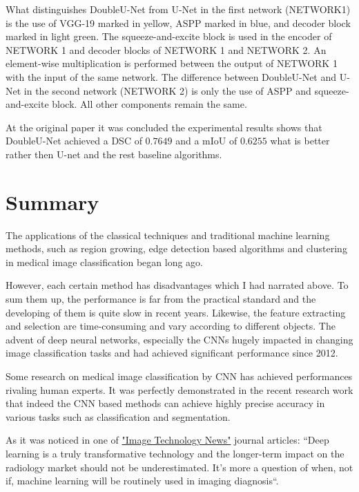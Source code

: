 What distinguishes DoubleU-Net from U-Net in the first network (NETWORK1) is the use of VGG-19 marked in yellow, ASPP marked in blue, and decoder block marked in light green. The squeeze-and-excite block is used in the encoder of NETWORK 1 and decoder blocks of NETWORK 1 and NETWORK 2. An element-wise multiplication is performed between the output of NETWORK 1 with the input of the same network. The difference between DoubleU-Net and U-Net in the second network (NETWORK 2) is only the use of ASPP and squeeze-and-excite block. All other components remain the same.

At the original paper \cite{Jha2020} it was concluded the experimental results shows that DoubleU-Net achieved a DSC of $0.7649$ and a mIoU of $0.6255$ what is better rather then U-net and the rest baseline algorithms. 

\section{Summary}
The applications of the classical techniques and traditional machine learning methods, such as region growing, edge detection based algorithms and clustering in medical image classification began long ago. 

However, each certain method has disadvantages which I had narrated above. To sum them up, the performance is far from the practical standard and the developing of them is quite slow in recent years. Likewise, the feature extracting and selection are time-consuming and vary according to different objects. The advent of deep neural networks, especially the CNNs hugely impacted in changing image classification tasks and had achieved significant performance since 2012.

Some research on medical image classification by CNN has achieved performances rivaling human experts. It was perfectly demonstrated in the recent research work \cite{Anwar2018} that indeed the CNN based methods can achieve highly precise accuracy in various tasks such as classification and segmentation. 

As it was noticed in one of  \href{https://www.itnonline.com/content/deep-learning-medical-imaging-create-300-million-market-2021}{"Image Technology News"} journal articles: ``Deep learning is a truly transformative technology and the longer-term impact on the radiology market should not be underestimated. It’s more a question of when, not if, machine learning will be routinely used in imaging diagnosis``. 


